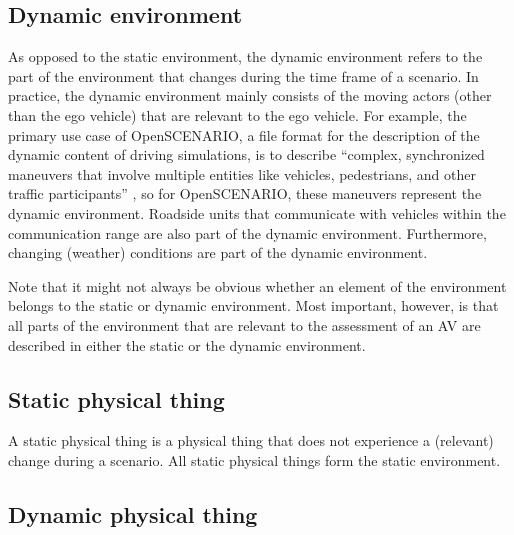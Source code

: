 \subsection{Dynamic environment}
\label{sec:dynamic environment}

As opposed to the static environment, the dynamic environment refers to the part of the environment that changes during the time frame of a scenario. 
In practice, the dynamic environment mainly consists of the moving actors (other than the ego vehicle) that are relevant to the ego vehicle.
For example, the primary use case of OpenSCENARIO, a file format for the description of the dynamic content of driving simulations, is to describe ``complex, synchronized maneuvers that involve multiple entities like vehicles, pedestrians, and other traffic participants'' \autocite{openscenario}, so for OpenSCENARIO, these maneuvers represent the dynamic environment.
Roadside units that communicate with vehicles within the communication range \autocite{alsultan2014comprehensive} are also part of the dynamic environment. Furthermore, changing (weather) conditions are part of the dynamic environment.

\begin{remark}
	Note that it might not always be obvious whether an element of the environment belongs to the static or dynamic environment. 
	Most important, however, is that all parts of the environment that are relevant to the assessment of an AV are described in either the static or the dynamic environment.
\end{remark}



\cstartc
\subsection{Static physical thing}
\label{sec:static physical thing}

A static physical thing is a physical thing that does not experience a (relevant) change during a scenario. All static physical things form the static environment.



\subsection{Dynamic physical thing}
\label{sec:dynamic physical thing}

